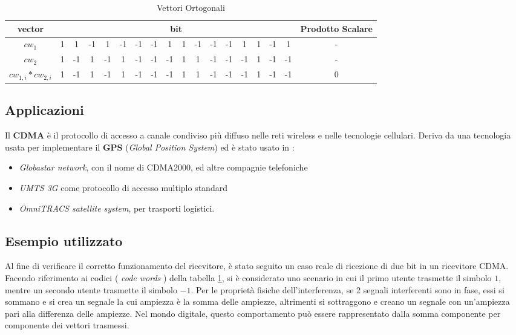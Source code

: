 \documentclass[a4paper,12pt]{article}
\begin{document}
    \begin{table}[H]
      \centering
      \begin{tabular}{| c | c | c | c | c | c | c | c | c | c | c | c | c | c | c | c | c | c |}\hline
        vector & \multicolumn{16}{|c|}{bit} & Prodotto Scalare \\ \hline
        \textbf{$cw_1$} &1&1&-1&1&-1&-1&-1&1&1&-1&-1&-1&1&1&-1&1& - \\ \hline
        \textbf{$cw_2$} &1&-1&1&-1&1&-1&-1&-1&1&1&-1&-1&-1&1&-1&-1& -\\ \hline
        \textbf{$cw_{1,i} * cw_{2,i}$} &1&-1&1&-1&1&-1&-1&-1&1&1&-1&-1&-1&1&-1&-1& 0 \\ \hline
      \end{tabular}
      \caption{Vettori Ortogonali}
      \label{tab:orthogonal vectors}
    \end{table}

    \subsection{Applicazioni}
     Il \textbf{CDMA} è il protocollo di accesso a canale condiviso più diffuso nelle reti wireless e nelle tecnologie
     cellulari. Deriva da una tecnologia usata per implementare il \textbf{GPS} (\textit{Global Position System}) ed è 
     stato usato in :
     \begin{itemize}
      \item \textit{Globastar network}, con il nome di CDMA2000, ed altre compagnie telefoniche
      \item \textit{UMTS 3G} come protocollo di accesso multiplo standard
      \item \textit{OmniTRACS satellite system}, per trasporti logistici.
     \end{itemize}
  \subsection{Esempio utilizzato}\label{Esempio}
    Al fine di verificare il corretto funzionamento del ricevitore, è stato seguito un caso reale di ricezione di due bit 
    in un ricevitore CDMA. Facendo riferimento ai codici ( \textit{code words} ) della tabella \ref{tab:orthogonal vectors},
    si è considerato uno scenario in cui il primo utente trasmette il simbolo $1$, mentre un secondo utente trasmette il 
    simbolo $-1$. Per le proprietà fisiche dell'interferenza, se 2 segnali interferenti sono in fase, essi si sommano e si
    crea un segnale la cui ampiezza è la somma delle ampiezze, altrimenti si sottraggono e creano un segnale con un'ampiezza pari alla differenza 
    delle ampiezze. Nel mondo digitale, questo comportamento può essere rappresentato dalla somma componente per componente
    dei vettori trasmessi.
\end{document}
